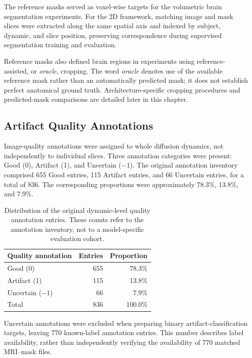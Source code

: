 The reference masks served as voxel-wise targets for the volumetric brain segmentation experiments. For the 2D framework, matching image and mask slices were extracted along the same spatial axis and indexed by subject, dynamic, and slice position, preserving correspondence during supervised segmentation training and evaluation.

Reference masks also defined brain regions in experiments using reference-assisted, or \emph{oracle}, cropping. The word \emph{oracle} denotes use of the available reference mask rather than an automatically predicted mask; it does not establish perfect anatomical ground truth. Architecture-specific cropping procedures and predicted-mask comparisons are detailed later in this chapter.

\subsection{Artifact Quality Annotations}

Image-quality annotations were assigned to whole diffusion dynamics, not independently to individual slices. Three annotation categories were present: Good (0), Artifact (1), and Uncertain ($-1$). The original annotation inventory comprised 655 Good entries, 115 Artifact entries, and 66 Uncertain entries, for a total of 836. The corresponding proportions were approximately 78.3\%, 13.8\%, and 7.9\%.

\begin{table}[htbp]
\centering
\caption{Distribution of the original dynamic-level quality annotation entries. These counts refer to the annotation inventory, not to a model-specific evaluation cohort.}
\label{tab:original_dynamic_annotation_counts}
\begin{tabular}{lrr}
\hline
Quality annotation & Entries & Proportion \\
\hline
Good (0) & 655 & 78.3\% \\
Artifact (1) & 115 & 13.8\% \\
Uncertain ($-1$) & 66 & 7.9\% \\
\hline
Total & 836 & 100.0\% \\
\hline
\end{tabular}
\end{table}

Uncertain annotations were excluded when preparing binary artifact-classification targets, leaving 770 known-label annotation entries. This number describes label availability, rather than independently verifying the availability of 770 matched MRI--mask files.

